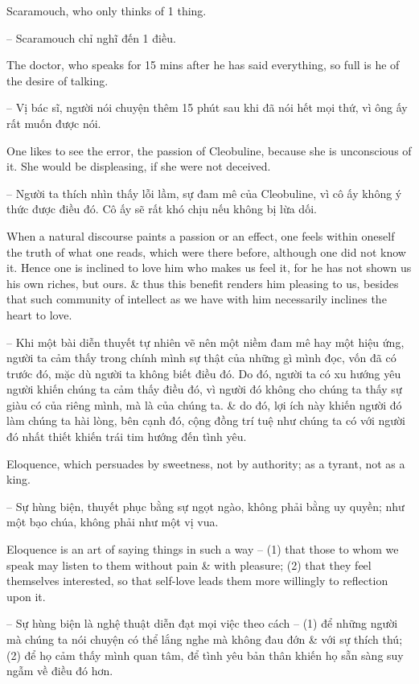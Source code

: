 \documentclass{article}
\begin{document}
\begin{enumerate}
\begin{itemize}
		 Scaramouch, who only thinks of 1 thing.
		
		-- Scaramouch chỉ nghĩ đến 1 điều.
		
		The doctor, who speaks for 15 mins after he has said everything, so full is he of the desire of talking.
		
		-- Vị bác sĩ, người nói chuyện thêm 15 phút sau khi đã nói hết mọi thứ, vì ông ấy rất muốn được nói.
		
		 One likes to see the error, the passion of Cleobuline, because she is unconscious of it. She would be displeasing, if she were not deceived.
		
		-- Người ta thích nhìn thấy lỗi lầm, sự đam mê của Cleobuline, vì cô ấy không ý thức được điều đó. Cô ấy sẽ rất khó chịu nếu không bị lừa dối.
		
		 When a natural discourse paints a passion or an effect, one feels within oneself the truth of what one reads, which were there before, although one did not know it. Hence one is inclined to love him who makes us feel it, for he has not shown us his own riches, but ours. \& thus this benefit renders him pleasing to us, besides that such community of intellect as we have with him necessarily inclines the heart to love.
		
		-- Khi một bài diễn thuyết tự nhiên vẽ nên một niềm đam mê hay một hiệu ứng, người ta cảm thấy trong chính mình sự thật của những gì mình đọc, vốn đã có trước đó, mặc dù người ta không biết điều đó. Do đó, người ta có xu hướng yêu người khiến chúng ta cảm thấy điều đó, vì người đó không cho chúng ta thấy sự giàu có của riêng mình, mà là của chúng ta. \& do đó, lợi ích này khiến người đó làm chúng ta hài lòng, bên cạnh đó, cộng đồng trí tuệ như chúng ta có với người đó nhất thiết khiến trái tim hướng đến tình yêu.
		
		 Eloquence, which persuades by sweetness, not by authority; as a tyrant, not as a king.
		
		-- Sự hùng biện, thuyết phục bằng sự ngọt ngào, không phải bằng uy quyền; như một bạo chúa, không phải như một vị vua.
		
		 Eloquence is an art of saying things in such a way -- (1) that those to whom we speak may listen to them without pain \& with pleasure; (2) that they feel themselves interested, so that self-love leads them more willingly to reflection upon it.
		
		-- Sự hùng biện là nghệ thuật diễn đạt mọi việc theo cách -- (1) để những người mà chúng ta nói chuyện có thể lắng nghe mà không đau đớn \& với sự thích thú; (2) để họ cảm thấy mình quan tâm, để tình yêu bản thân khiến họ sẵn sàng suy ngẫm về điều đó hơn.
		

\end{itemize}
\end{enumerate}
\end{document}
